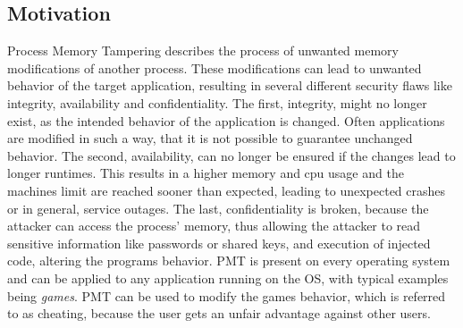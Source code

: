 \subsection{Motivation}
Process Memory Tampering describes the process of unwanted memory modifications of another process. These modifications can lead to unwanted behavior of the target application, resulting in several different security flaws like integrity, availability and confidentiality. The first, integrity, might no longer exist, as the intended behavior of the application is changed. Often applications are modified in such a way, that it is not possible to guarantee unchanged behavior. The second, availability, can no longer be ensured if the changes lead to longer runtimes. This results in a higher memory and cpu usage and the machines limit are reached sooner than expected, leading to unexpected crashes or in general, service outages. The last, confidentiality is broken, because the attacker can access the process' memory, thus allowing the attacker to read sensitive information like passwords or shared keys, and execution of injected code, altering the programs behavior. PMT is present on every operating system and can be applied to any application running on the OS, with typical examples being \emph{games}. PMT can be used to modify the games behavior, which is referred to as cheating, because the user gets an unfair advantage against other users.
